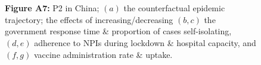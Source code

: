 \documentclass[paper=a4,fontsize=11pt]{article}
\begin{document}
\begin{figure}[!h]
  \\
  \hspace{1.76cm}
  \\
  \caption*{\textbf{Figure A7:} P2 in China; $(a)$ the counterfactual epidemic trajectory; the effects of increasing/decreasing $(b,c)$ the government response time \& proportion of cases self-isolating, $(d,e)$ adherence to NPIs during lockdown \& hospital capacity, and $(f,g)$ vaccine administration rate \& uptake.}
\end{figure}
\end{document}
